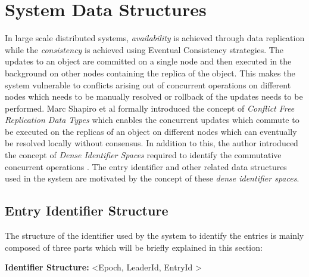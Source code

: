 \documentclass[a4paper,11pt]{kth-mag}
\begin{document}
\section{System Data Structures}

In large scale distributed systems, \textit{availability} is achieved through data replication while the \textit{consistency} is achieved using Eventual Consistency strategies. The updates to an object are committed on a single node and then executed in the background on other nodes containing the replica of the object. This makes the system vulnerable to conflicts arising out of concurrent operations on different nodes which needs to be manually resolved or rollback of the updates needs to be performed. Marc Shapiro et al formally introduced the concept of \textit{Conflict Free Replication Data Types} \cite{crdt} \cite{crdtConcurrencyWithoutControl} which  enables the concurrent updates which commute to be executed on the replicas of an object on different nodes which can eventually be resolved locally without consensus. In addition to this, the author introduced the concept of \textit{Dense Identifier Spaces} required to identify the commutative concurrent operations \cite{crdtConcurrencyWithoutControl}. The entry identifier and other related data structures used in the system are motivated by the concept of these \textit{dense  identifier spaces}.


\subsection{Entry Identifier Structure}
\label{ssec:entryIdStructure}

The structure of the identifier used by the system to identify the entries is mainly composed of three parts which will be briefly explained in this section:

\begin{tcolorbox}
\textbf{Identifier Structure:} \textless Epoch, LeaderId, EntryId \textgreater
\end{tcolorbox}
\end{document}
